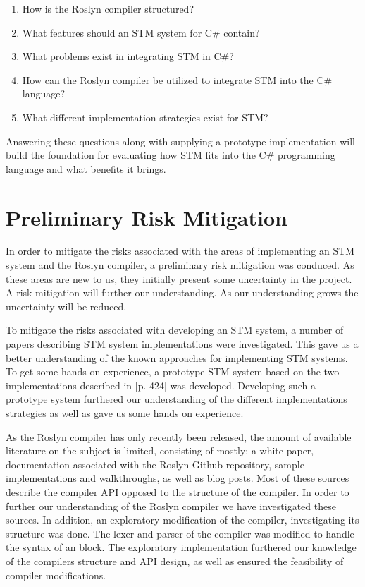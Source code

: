 \begin{enumerate}
\item How is the Roslyn compiler structured?
\item What features should an \ac{STM} system for C\# contain?
\item What problems exist in integrating \ac{STM} in C\#?
\item How can the Roslyn compiler be utilized to integrate \ac{STM} into the C\# language?
\item What different implementation strategies exist for \ac{STM}?
\end{enumerate}

Answering these questions along with supplying a prototype implementation will build the foundation for evaluating how \ac{STM} fits into the C\# programming language and what benefits it brings.
 
\section{Preliminary Risk Mitigation}
In order to mitigate the risks associated with the areas of implementing an \ac{STM} system and the Roslyn compiler, a preliminary risk mitigation was conduced. As these areas are new to us, they initially present some uncertainty in the project. A risk mitigation will further our understanding. As our understanding grows the uncertainty will be reduced.

To mitigate the risks associated with developing an \ac{STM} system, a number of papers describing \ac{STM} system implementations were investigated. This gave us a better understanding of the known approaches for implementing \ac{STM} systems. To get some hands on experience, a prototype \ac{STM} system based on the two implementations described in \cite{herlihy2012art}[p. 424] was developed. Developing such a prototype system furthered our understanding of the different implementations strategies as well as gave us some hands on experience.

As the Roslyn compiler has only recently been released, the amount of available literature on the subject is limited, consisting of mostly: a white paper\cite{ng2012roslyn}, documentation associated with the Roslyn Github repository\cite{roslynwiki}, sample implementations and walkthroughs\cite{roslynsamples}, as well as blog posts. Most of these sources describe the compiler \ac{API} opposed to the structure of the compiler. In order to further our understanding of the Roslyn compiler we have investigated these sources. In addition, an exploratory modification of the compiler, investigating its structure was done. The lexer and parser of the compiler was modified to handle the syntax of an  block. The exploratory implementation furthered our knowledge of the compilers structure and \ac{API} design, as well as ensured the feasibility of compiler modifications.


\worksheetend